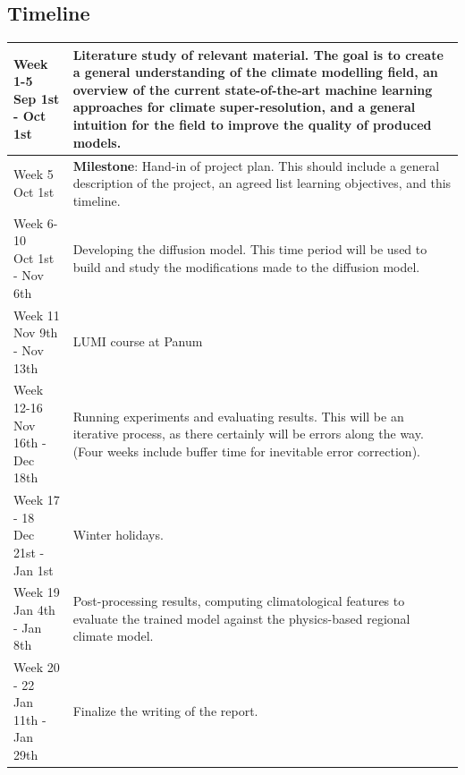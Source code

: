 \documentclass[11pt,a4paper]{article}
\begin{document}
\newpage

\subsection*{Timeline}
\begin{tabularx}{\textwidth}{lX}
    \makecell{Week 1-5 \\ Sep 1st - Oct 1st} & Literature study of relevant material. The goal is to create a general understanding of the climate modelling field, an overview of the current state-of-the-art machine learning approaches for climate super-resolution, and a general intuition for the field to improve the quality of produced models. \\ \hline
    \makecell{Week 5 \\ Oct 1st} & \textbf{Milestone}: Hand-in of project plan. This should include a general description of the project, an agreed list learning objectives, and this timeline. \\ \hline
    \makecell{Week 6-10 \\ Oct 1st - Nov 6th} & Developing the diffusion model. This time period will be used to build and study the modifications made to the diffusion model. \\ \hline
    \makecell{Week 11 \\ Nov 9th - Nov 13th} & LUMI course at Panum \\ \hline
    \makecell{Week 12-16 \\ Nov 16th - Dec 18th} & Running experiments and evaluating results. This will be an iterative process, as there certainly will be errors along the way. (Four weeks include buffer time for inevitable error correction). \\ \hline
    \makecell{Week 17 - 18 \\ Dec 21st - Jan 1st} & Winter holidays. \\ \hline
    \makecell{Week 19 \\ Jan 4th - Jan 8th} & Post-processing results, computing climatological features to evaluate the trained model against the physics-based regional climate model. \\ \hline
    \makecell{Week 20 - 22 \\ Jan 11th - Jan 29th} & Finalize the writing of the report.
\end{tabularx}
\end{document}

